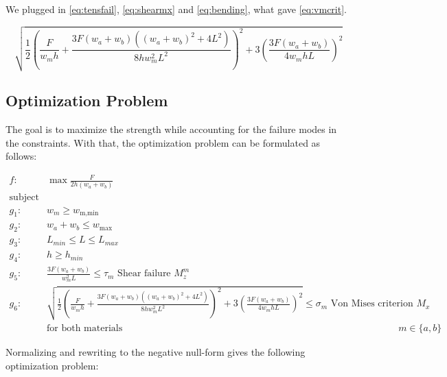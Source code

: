 We plugged in \autoref{eq:tensfail}, \ref{eq:shearmx} and \ref{eq:bending}, what gave \ref{eq:vmcrit}.

\begin{equation}
	\label{eq:vmcrit}
	\sqrt{\frac{1}{2} \left( \frac{F}{w_m  h} + 	\frac{ 3 F \left(w_a + w_b \right) \left(\left(w_a + w_b \right) ^2 + 4L^2 \right)  }{ 8h w_m^2 L^2 }   \right)^2+ 3\left(	\frac{ 3 F \left(w_a + w_b \right) }{ 4  w_m h L }  \right) ^2}
\end{equation}


\subsection{Optimization Problem}
The goal is to maximize the strength while accounting for the failure modes in the constraints.
With that, the optimization problem can be formulated as follows:

\begin{align}
	f: & \max \frac{F}{2h \left(w_a + w_b\right)} \nonumber \\
	\text{subject to:} & \nonumber \\
	g_1: & w_m \ge w_\text{m,min} \\
	g_2: & w_a + w_b \le w_\text{max} \\
	g_3: & L_{min} \le L \le L_{max} \\
	g_4: & h \ge h_{min} \\
	g_5: & \frac{ 3 F \left(w_a + w_b \right) }{ w_m ^2 L} \le \tau_m						\text{ Shear failure } M_z^m \\
	g_6:& \sqrt{\frac{1}{2} \left( \frac{F}{w_m  h} + 	\frac{ 3 F \left(w_a + w_b \right) \left(\left(w_a + w_b \right) ^2 + 4L^2 \right)  }{ 8h w_m^2 L^2 }   \right)^2+ 3\left(	\frac{ 3 F \left(w_a + w_b \right) }{ 4  w_m h L}  \right) ^2}		\le 	\sigma_m	\text{ Von Mises criterion } M_x \\
	& \text{for both materials } && m \in \{a, b\} \nonumber 
\end{align}


Normalizing and rewriting to the negative null-form gives the following optimization problem:

